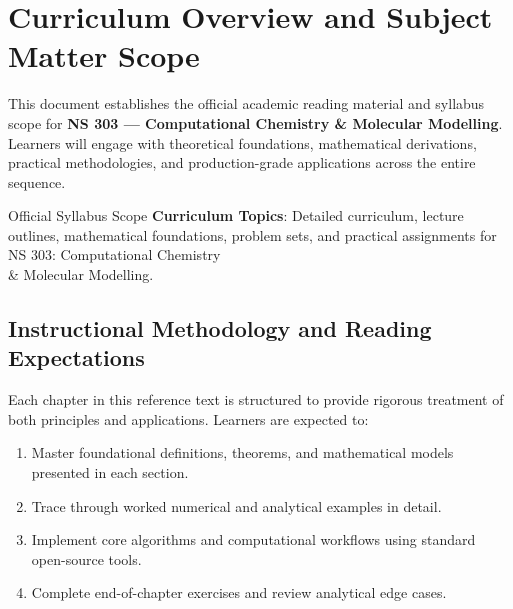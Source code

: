 \section{Curriculum Overview and Subject Matter Scope}

This document establishes the official academic reading material and syllabus scope for \textbf{NS 303 --- Computational Chemistry \& Molecular Modelling}. Learners will engage with theoretical foundations, mathematical derivations, practical methodologies, and production-grade applications across the entire sequence.

\begin{InsightBox}{Official Syllabus Scope}
  \textbf{Curriculum Topics}: Detailed curriculum, lecture outlines, mathematical foundations, problem sets, and practical assignments for NS 303: Computational Chemistry \\& Molecular Modelling.
\end{InsightBox}

\subsection{Instructional Methodology and Reading Expectations}

Each chapter in this reference text is structured to provide rigorous treatment of both principles and applications. Learners are expected to:
\begin{enumerate}
  \item Master foundational definitions, theorems, and mathematical models presented in each section.
  \item Trace through worked numerical and analytical examples in detail.
  \item Implement core algorithms and computational workflows using standard open-source tools.
  \item Complete end-of-chapter exercises and review analytical edge cases.
\end{enumerate}

